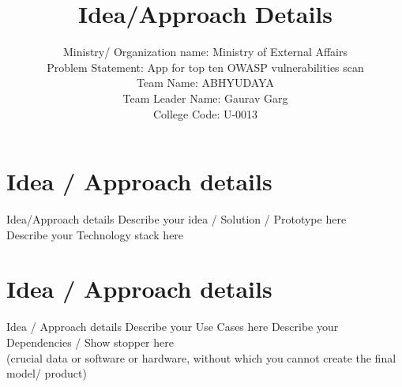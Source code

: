 \documentclass[handout,t]{beamer}
\title[]{Idea/Approach Details}
\date{}
\author[]{Ministry/ Organization name: Ministry of External Affairs \\Problem Statement: App for top ten OWASP vulnerabilities scan \\Team Name: ABHYUDAYA\\Team Leader Name: Gaurav Garg\\ College Code: U-0013}
\begin{document}

\frame{\titlepage}
\section[]{}


\section{Idea / Approach details}
\begin{frame}{Idea/Approach details}
Describe your idea / Solution / Prototype here
\\
Describe your Technology stack here
\end{frame}

\section{Idea / Approach details}
\begin{frame}{Idea / Approach details}
Describe your Use Cases here
Describe your Dependencies / Show stopper here
\\
(crucial data or software or hardware, without which you cannot create the final
model/ product)
\end{frame}


\end{document}
